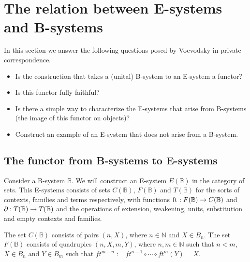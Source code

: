 \documentclass{article}
\begin{document}














\section{The relation between E-systems and B-systems}

In this section we answer the following questions posed by Voevodsky in private
correspondence.
\begin{itemize}
\item Is the construction that takes a (unital) B-system to an E-system a functor?
\item Is this functor fully faithful?
\item Is there a simple way to characterize the E-systems that arise from B-systems (the image of this functor on objects)?
\item Construct an example of an E-system that does not arise from a B-system.
\end{itemize}

\subsection{The functor from B-systems to E-systems}
Consider a B-system $\mathbb{B}$. We will construct an E-system $E(\mathbb{B})$
in the category of sets. This E-systems consists of sets $C(\mathbb{B})$,
$F(\mathbb{B})$ and $T(\mathbb{B})$ for the sorts of contexts, families and
terms respectively, with functions $\mathrm{ft}_{}:F(\mathbb{B})\to C(\mathbb{B})$ and
$\partial_{}:T(\mathbb{B})\to T(\mathbb{B})$ and the operations of extension,
weakening, units, substitution and empty contexts and families.

The set $C(\mathbb{B})$ consists of pairs $(n,X)$, where $n\in\mathbb{N}$ and
$X\in B_n$. The set $F(\mathbb{B})$ consists of quadruples $(n,X,m,Y)$, where
$n,m\in\mathbb{N}$ such that $n<m$, $X\in B_n$ and $Y\in B_{m}$ such that
$ft^{m-n}:=ft^{n-1}\circ\cdots\circ ft^m(Y)=X$.

%

\end{document}

